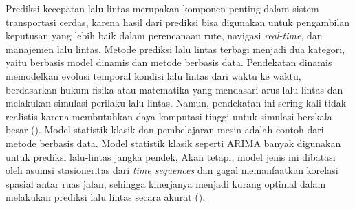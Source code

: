Prediksi kecepatan lalu lintas merupakan komponen penting dalam sistem transportasi cerdas, karena hasil dari prediksi bisa digunakan untuk pengambilan keputusan yang lebih baik dalam perencanaan rute, navigasi \textit{real-time}, dan manajemen lalu lintas. Metode prediksi lalu lintas terbagi menjadi dua kategori, yaitu berbasis model dinamis dan metode berbasis data. Pendekatan dinamis memodelkan evolusi temporal kondisi lalu lintas dari waktu ke waktu, berdasarkan hukum fisika atau matematika yang mendasari arus lalu lintas dan melakukan simulasi perilaku lalu lintas. Namun, pendekatan ini sering kali tidak realistis karena membutuhkan daya komputasi tinggi untuk simulasi berskala besar (\cite{Vlahogianni2015}). Model statistik klasik dan pembelajaran mesin adalah contoh dari metode berbasis data. Model statistik klasik seperti ARIMA banyak digunakan untuk prediksi lalu-lintas jangka pendek, Akan tetapi, model jenis ini dibatasi oleh asumsi stasioneritas  dari \textit{time sequences} dan gagal memanfaatkan korelasi spasial antar ruas jalan, sehingga kinerjanya menjadi kurang optimal dalam melakukan prediksi lalu lintas secara akurat (\cite{AhmedCook1979}).

